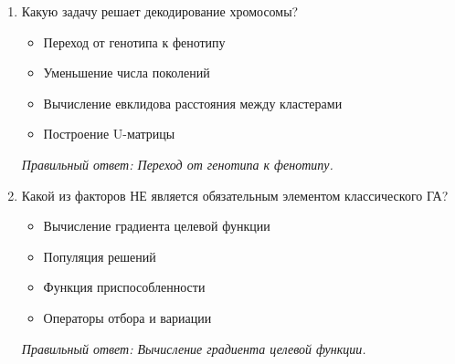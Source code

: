 \begin{enumerate}[label=\textbf{\arabic*.}, leftmargin=0pt, itemsep=1.2em]
\item Какую задачу решает декодирование хромосомы?
\begin{itemize}[label=$\square$, leftmargin=1.5cm, itemsep=0.2em, topsep=0.3em]
\item Переход от генотипа к фенотипу
\item Уменьшение числа поколений
\item Вычисление евклидова расстояния между кластерами
\item Построение U-матрицы
\end{itemize}
{\small\textit{Правильный ответ: Переход от генотипа к фенотипу.}}

\item Какой из факторов НЕ является обязательным элементом классического ГА?
\begin{itemize}[label=$\square$, leftmargin=1.5cm, itemsep=0.2em, topsep=0.3em]
\item Вычисление градиента целевой функции
\item Популяция решений
\item Функция приспособленности
\item Операторы отбора и вариации
\end{itemize}
{\small\textit{Правильный ответ: Вычисление градиента целевой функции.}}

\end{enumerate}
